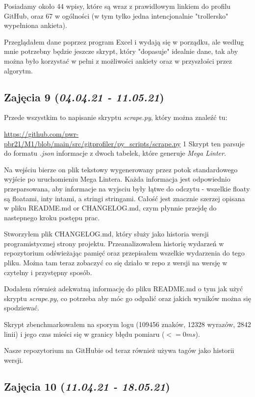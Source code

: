 \documentclass[graybox]{svmult}
\begin{document}
Posiadamy około 44 wpisy, które są wraz z prawidłowym linkiem do profilu GitHub, oraz 67 w ogólności (w tym tylko jedna intencjonalnie "trollersko" wypełniona ankieta).

Przeglądałem dane poprzez program Excel i wydają się w porządku, ale według mnie potrzebny będzie jeszcze skrypt, który "dopasuje" idealnie dane, tak aby można było korzystać w pełni z możliwości ankiety oraz w przyszłości przez algorytm.


\subsection{Zajęcia 9 (\emph{04.04.21 - 11.05.21})}

Przede wszystkim to napisanie skryptu \textit{scrape.py}, który można znaleźć tu:

\href{scrape.py}{\url{https://github.com/pwr-pbr21/M1/blob/main/src/gitprofiler/py_scripts/scrape.py}}
1
Skrypt ten parsuje do formatu \emph{.json} informacje z dwoch tabelek, które generuje \emph{Mega Linter}.

Na wejściu bierze on plik tekstowy wygenerowany przez potok standardowego wyjście po uruchomieniu Mega Lintera. Każda informacja jest odpowiednio przeparsowana, aby informacje na wyjsciu były łątwe do odczytu - wszelkie floaty są floatami, inty intami, a stringi stringami. Całość jest znacznie szerzej opisana w pliku README.md or CHANGELOG.md, czym płynnie przejdę do nastepnego kroku postępu prac.

Stworzyłem plik CHANGELOG.md, który służy jako historia wersji programistycznej strony projektu. Przeanalizowałem historię wydarzeń w repozytorium odświeżając pamięć oraz przepisałem wszelkie wydarzenia do tego pliku. Można tam teraz zobaczyć co się działo w repo z wersji na wersję w czytelny i przystępny sposób.

Dodałem również adekwatną informację do pliku README.md o tym jak użyć skryptu \emph{scrape.py}, co potrzeba aby móc go odpalić oraz jakich wyników można się spodziewać.

Skrypt zbenchmarkowałem na sporym logu (109456 znaków, 12328 wyrazów, 2842 linii) i jego czas mieści się w granicy błędu pomiaru ($<= 0ms$).

Nasze repozytorium na GitHubie od teraz również używa tagów jako historii wersji.

\subsection{Zajęcia 10 (\emph{11.04.21 - 18.05.21})}
\end{document}
